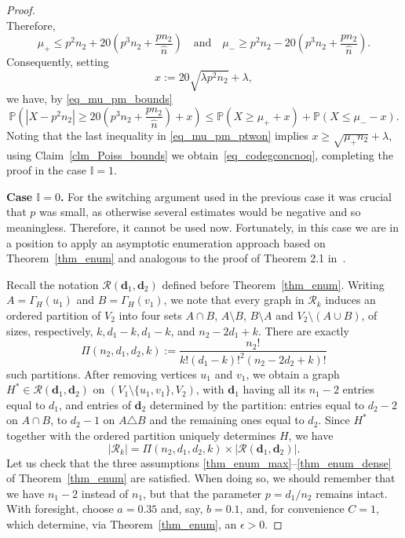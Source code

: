 \documentclass[12pt,reqno]{amsart}
\newcommand{\rc}{{\mathcal{R}}}
\newcommand{\Prob} {\mathbb {P}}
\newcommand{\prob}[1]{\Prob\left(#1\right)}
\newcommand{\I} {\mathbb I}
\newcommand{\dd}{\mathbf{d}}
\newcommand{\rcdd}{\rc(\dd_1,\dd_2)}
\theoremstyle{definition}
\begin{document}
\begin{proof}
\begin{equation}
\end{equation}
Therefore,
\begin{equation}
\label{eq_mu_pm_bounds}
  \mu_+ \le p^2n_2 + 20\left(p^3n_2 + \frac{pn_2}{\hat n} \right) \quad\text{and}\quad \mu_- \ge p^2n_2 - 20\left(p^3n_2 + \frac{pn_2}{\hat n} \right).
\end{equation}
Consequently, setting
\begin{equation}
  \label{eq_def_x}
	x := 20 \sqrt{\lambda p^2 n_2} + \lambda,
\end{equation}
we have, by \eqref{eq_mu_pm_bounds}
\begin{equation*}
     \prob{|X - p^2n_2| \ge 20\left(p^3n_2 + \frac{pn_2}{\hat n}\right)  + x} \le \prob{X \ge \mu_+ + x} + \prob{X\le \mu_- - x}.
   \end{equation*}
Noting that the last inequality in \eqref{eq_mu_pm_ptwon} implies $x \ge \sqrt{\mu_+n_2} + \lambda $, using Claim~\ref{clm_Poiss_bounds} we obtain~\eqref{eq_codegconcnoq}, completing the proof in the case $\I = 1$.



\medskip
\textbf{Case $\I = 0$.} For the switching argument used in the previous case it was crucial that $p$ was small, as otherwise several estimates would be negative and so meaningless. Therefore, it cannot be used now. Fortunately, in this case we are in a position to apply an asymptotic enumeration approach based on Theorem~\ref{thm_enum} and analogous to the proof of Theorem 2.1 in~\cite{KSVW}.

Recall the notation $\rcdd$ defined before Theorem~\ref{thm_enum}.
Writing $A = \Gamma_H(u_1)$ and $B = \Gamma_H(v_1)$, we note that every graph in $\rc_k$ induces an ordered partition of $V_2$ into four sets $A \cap B$, $A \setminus B$, $B \setminus A$ and $V_2 \setminus (A \cup B)$, of sizes, respectively, $k, d_1 - k, d_1 - k$, and $n_2 - 2d_1 + k$. There are exactly
$$\Pi(n_2,d_1,d_2,k):=\frac{n_2!}{k!(d_1 - k)!^2(n_2 - 2d_2 + k)!} $$
such partitions.
After removing vertices $u_1$ and $v_1$, we obtain a graph $H^* \in \rcdd$ on $(V_1\setminus\{u_1,v_1\}, V_2)$, with $\dd_1$ having all its $n_1 - 2$ entries equal to $d_1$, and entries of $\dd_2$ determined by the partition:  entries equal to $d_2 - 2$ on $A \cap B$, to $d_2 - 1$ on $A \triangle B$ and the remaining ones equal to $d_2$.
Since $H^*$ together with the ordered partition uniquely determines $H$, we have
\begin{equation*}
	|\rc_k| = \Pi(n_2,d_1,d_2,k)\times  |\rc(\dd_1,\dd_2)|.
\end{equation*}
Let us check that the three assumptions \ref{thm_enum_max}--\ref{thm_enum_dense} of Theorem~\ref{thm_enum} are satisfied. When doing so, we should remember that we have $n_1 - 2$ instead of $n_1$, but that the parameter $p = d_1/n_2$ remains intact.
With foresight, choose $a = 0.35$ and, say, $b = 0.1$, and, for convenience $C = 1$, which determine, via Theorem~\ref{thm_enum}, an $\epsilon > 0$.


\end{proof}
\end{document}
